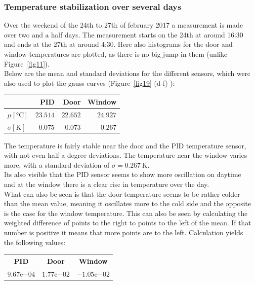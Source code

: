 \documentclass[12pt]{scrartcl}
\begin{document}
      \subsubsection{Temperature stabilization over several days}
      Over the weekend of the 24th to 27th of february 2017 a measurement is made over two
      and a half days. The measurement starts on the 24th at around 16:30 and
      ends at the 27th at around 4:30. Here also histograms for the
      door and window temperatures are plotted, as there is no big jump in them (unlike
      Figure~\ref{fig11}).\\
      Below are the mean and standard deviations for the different sensors, which
      were also used to plot the gauss curves (Figure~\ref{fig19} (d-f) ):
      \\
      \begin{table}[H]
        \begin{tabular}{l | r | r | r}
          & PID & Door & Window \\
          \hline
          $\mu[\text{°C}]$ & $23.514$ & $22.652$ & $24.927$ \\
          $\sigma[\text{K}]$ & $0.075$ & $0.073$ & $0.267$
        \end{tabular}
      \end{table}
      The temperature is fairly stable near the door and the PID
      temperature sensor, with
      not even half a degree deviations. The temperature near the window varies
      more, with a standard deviation of $\sigma = 0.267~\text{K}$.\\
      Its also visible that the PID sensor seems to show more oscillation on
      daytime and at the window there is a clear rise in temperature over the day.
      \\What can also be seen is that the door temperature seems to be rather
      colder than the mean value, meaning it oscillates more to the cold side
      and the opposite is the case for the window temperature. This can also be
      seen by calculating the weighted difference of points to the right to
      points to the left of the mean. If that number is positive it means that
      more points are to the left.
      Calculation yields the following values: \vspace{-5pt}
      \begin{table}[H]
        \begin{tabular}{c | c | c}
          PID & Door & Window \\
          \hline
          $9.67\mathrm{e}{-04}$ & $1.77\mathrm{e}{-02}$ & $-1.05\mathrm{e}{-02}$
        \end{tabular}
      \end{table}
\end{document}
